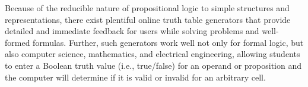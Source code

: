 \documentclass[ms]{uncgdissertationexp2}
\theoremstyle{plain}
\theoremstyle{definition}
\theoremstyle{remark}
\begin{document}
        Because of the reducible nature of propositional logic to simple structures and representations, there exist plentiful online truth table generators that provide detailed and immediate feedback for users while solving problems and well-formed formulas. Further, such generators work well not only for formal logic, but also computer science, mathematics, and electrical engineering, allowing students to enter a Boolean truth value (i.e., true/false) for an operand or proposition and the computer will determine if it is valid or invalid for an arbitrary cell. 
\end{document}
